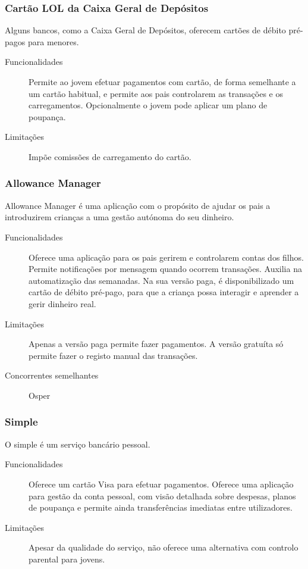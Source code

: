\documentclass[12pt,a4paper]{article}
\begin{document}
    \subsubsection{Cartão LOL da Caixa Geral de Depósitos}

      Alguns bancos, como a Caixa Geral de Depósitos, oferecem cartões de débito pré-pagos para menores.

      \begin{description}
        \item[Funcionalidades] Permite ao jovem efetuar pagamentos com cartão, de forma semelhante a um cartão habitual, e permite aos pais controlarem as transações e os carregamentos. Opcionalmente o jovem pode aplicar um plano de poupança.
        \item[Limitações]Impõe comissões de carregamento do cartão.
      \end{description}


    \subsubsection{Allowance Manager}

      Allowance Manager é uma aplicação com o propósito de ajudar os pais a introduzirem crianças a uma gestão autónoma do seu dinheiro.

      \begin{description}
        \item[Funcionalidades]Oferece uma aplicação para os pais gerirem e controlarem contas dos filhos. Permite notificações por mensagem quando ocorrem transações. Auxilia na automatização das semanadas. Na sua versão paga, é disponibilizado um cartão de débito pré-pago, para que a criança possa interagir e aprender a gerir dinheiro real.
        \item[Limitações]Apenas a versão paga permite fazer pagamentos. A versão gratuíta só permite fazer o registo manual das transações.
        \item[Concorrentes semelhantes]Osper
      \end{description}
      
    \subsubsection{Simple}

      O simple é um serviço bancário pessoal.

      \begin{description}
        \item[Funcionalidades]Oferece um cartão Visa para efetuar pagamentos. Oferece uma aplicação para gestão da conta pessoal, com visão detalhada sobre despesas, planos de poupança e permite ainda transferências imediatas entre utilizadores.
        \item[Limitações]Apesar da qualidade do serviço, não oferece uma alternativa com controlo parental para jovens.
      \end{description}
      
\end{document}
